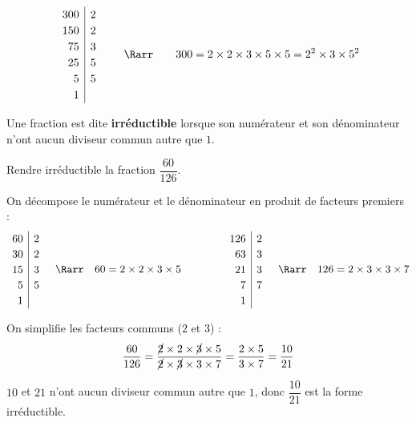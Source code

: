 \begin{exemple}[Décomposition]
	\[
		\def\arraystretch{1.2}%
		\begin{array}{r|l}%
			300 & 2 \\
			150 & 2 \\
			75  & 3 \\
			25  & 5 \\
			5   & 5 \\
			1   &
		\end{array}\qquad\Rarr\qquad 300 = 2 \times 2 \times 3 \times 5 \times 5 = 2^2 \times 3 \times 5^2
	\]
\end{exemple}

\newpage

\begin{definition}
	Une fraction est dite \textbf{irréductible} lorsque son numérateur et son dénominateur n'ont aucun diviseur commun autre que $1$.
\end{definition}

\begin{methode}
	Rendre irréductible la fraction $\dfrac{60}{126}$.

	\begin{correction}
		On décompose le numérateur et le dénominateur en produit de facteurs premiers :
		\[
			\def\arraystretch{1.2}%
			\begin{array}{r|l}%
				60 & 2 \\
				30 & 2 \\
				15 & 3 \\
				5  & 5 \\
				1  &
			\end{array}%
			\quad \Rarr \quad 60 = 2 \times 2 \times 3 \times 5 \qquad\qquad \def\arraystretch{1.2}%
			\begin{array}{r|l}%
				126 & 2 \\
				63  & 3 \\
				21  & 3 \\
				7   & 7 \\
				1   &
			\end{array}%
			\quad \Rarr \quad 126 = 2 \times 3 \times 3 \times 7
		\]

		\ms

		On simplifie les facteurs communs ($2$ et $3$) :
		\[
			\frac{60}{126} = \frac{\cancel{2} \times 2 \times \cancel{3} \times 5}{\cancel{2} \times \cancel{3} \times 3 \times 7} = \frac{2 \times 5}{3 \times 7} = \frac{10}{21}
		\]

		$10$ et $21$ n'ont aucun diviseur commun autre que $1$, donc $\dfrac{10}{21}$ est la forme irréductible.
	\end{correction}
\end{methode}

